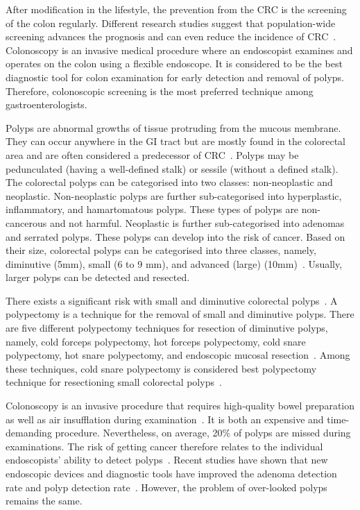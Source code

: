 \documentclass[journal]{IEEEtran}
\begin{document}
After modification in the lifestyle, the prevention from the \ac{CRC} is the screening of the colon regularly. Different research studies suggest that population-wide screening advances the prognosis and can even reduce the incidence of \ac{CRC}~\cite{holme2013flexible}. Colonoscopy is an invasive medical procedure where an endoscopist examines and operates on the colon using a flexible endoscope. It is considered to be the best diagnostic tool for colon examination for early detection and removal of polyps. Therefore, colonoscopic screening is the most preferred technique among gastroenterologists.  




Polyps are abnormal growths of tissue protruding from the mucous membrane. They can occur anywhere in the \ac{GI} tract but are mostly found in the colorectal area and are often considered a predecessor of \ac{CRC}~\cite{jha2019resunet++,holzheimer2001surgical}. Polyps may be pedunculated (having a well-defined stalk) or sessile (without a defined stalk). The colorectal polyps can be categorised into two classes: non-neoplastic and neoplastic. Non-neoplastic polyps are further sub-categorised into hyperplastic, inflammatory, and hamartomatous polyps. These types of polyps are non-cancerous and not harmful. Neoplastic is further sub-categorised into adenomas and serrated polyps. These polyps can develop into the risk of cancer. Based on their size, colorectal polyps can be categorised into three classes, namely, diminutive (5mm), small (6 to 9 mm), and advanced (large) (10mm)~\cite{lee2016resection}. Usually, larger polyps can be detected and resected.

There exists a significant risk with small and diminutive colorectal polyps~\cite{ponugoti2017risk}. A polypectomy is a technique for the removal of small and diminutive polyps. There are five different polypectomy techniques for resection of diminutive polyps, namely, cold forceps polypectomy, hot forceps polypectomy, cold snare polypectomy, hot snare polypectomy, and endoscopic mucosal resection~\cite{lee2016resection}. Among these techniques, cold snare polypectomy is considered best polypectomy technique for resectioning small colorectal polyps~\cite{tranquillini2018best}.  


Colonoscopy is an invasive procedure that requires high-quality bowel preparation as well as air insufflation during examination~\cite{kronborg2007population}. It is both an expensive and time-demanding procedure.  Nevertheless, on average, 20\% of polyps are missed during examinations. The risk of getting cancer therefore relates to the individual endoscopists' ability to detect polyps~\cite{kaminski2010quality}. Recent studies have shown that new endoscopic devices and diagnostic tools have improved the adenoma detection rate and polyp detection rate~\cite{castaneda2018new,matyja2019improve}. However, the problem of over-looked polyps remains the same. 
\end{document}
